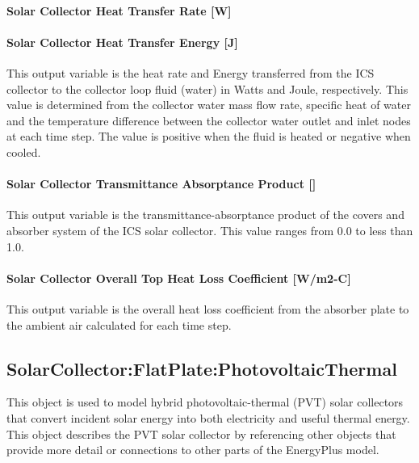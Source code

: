 \paragraph{Solar Collector Heat Transfer Rate {[}W{]}}\label{solar-collector-heat-transfer-rate-w-1}

\paragraph{Solar Collector Heat Transfer Energy {[}J{]}}\label{solar-collector-heat-transfer-energy-j-1}

This output variable is the heat rate and Energy transferred from the ICS collector to the collector loop fluid (water) in Watts and Joule, respectively. This value is determined from the collector water mass flow rate, specific heat of water and the temperature difference between the collector water outlet and inlet nodes at each time step. The value is positive when the fluid is heated or negative when cooled.

\paragraph{Solar Collector Transmittance Absorptance Product {[]}}\label{solar-collector-transmittance-absorptance-product}

This output variable is the transmittance-absorptance product of the covers and absorber system of the ICS solar collector. This value ranges from 0.0 to less than 1.0.

\paragraph{Solar Collector Overall Top Heat Loss Coefficient {[}W/m2-C{]}}\label{solar-collector-overall-top-heat-loss-coefficient-wm2-c}

This output variable is the overall heat loss coefficient from the absorber plate to the ambient air calculated for each time step.

\subsection{SolarCollector:FlatPlate:PhotovoltaicThermal}\label{solarcollectorflatplatephotovoltaicthermal}

This object is used to model hybrid photovoltaic-thermal (PVT) solar collectors that convert incident solar energy into both electricity and useful thermal energy. This object describes the PVT solar collector by referencing other objects that provide more detail or connections to other parts of the EnergyPlus model.

